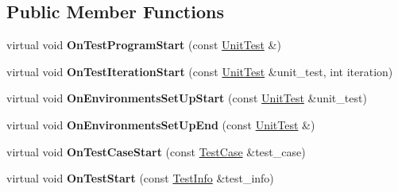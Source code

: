 \subsection*{Public Member Functions}
\begin{DoxyCompactItemize}
\item 
\mbox{\label{classtesting_1_1internal_1_1_pretty_unit_test_result_printer_a7a6b6de195b4ef3c9f2edd2e6c270f3e}} 
virtual void {\bfseries On\+Test\+Program\+Start} (const \mbox{\hyperlink{classtesting_1_1_unit_test}{Unit\+Test}} \&)
\item 
\mbox{\label{classtesting_1_1internal_1_1_pretty_unit_test_result_printer_abdba10a8c97e272ab4cee97cb652c957}} 
virtual void {\bfseries On\+Test\+Iteration\+Start} (const \mbox{\hyperlink{classtesting_1_1_unit_test}{Unit\+Test}} \&unit\+\_\+test, int iteration)
\item 
\mbox{\label{classtesting_1_1internal_1_1_pretty_unit_test_result_printer_a846a5e82b421e04fcdd2b1b2b64b162f}} 
virtual void {\bfseries On\+Environments\+Set\+Up\+Start} (const \mbox{\hyperlink{classtesting_1_1_unit_test}{Unit\+Test}} \&unit\+\_\+test)
\item 
\mbox{\label{classtesting_1_1internal_1_1_pretty_unit_test_result_printer_aadba892f02606a8b0c5f5982b3553aac}} 
virtual void {\bfseries On\+Environments\+Set\+Up\+End} (const \mbox{\hyperlink{classtesting_1_1_unit_test}{Unit\+Test}} \&)
\item 
\mbox{\label{classtesting_1_1internal_1_1_pretty_unit_test_result_printer_adcb68c729565d4bcdf8418a52902c3de}} 
virtual void {\bfseries On\+Test\+Case\+Start} (const \mbox{\hyperlink{classtesting_1_1_test_case}{Test\+Case}} \&test\+\_\+case)
\item 
\mbox{\label{classtesting_1_1internal_1_1_pretty_unit_test_result_printer_a5078ee71cfa97e37ae7a9366149195c5}} 
virtual void {\bfseries On\+Test\+Start} (const \mbox{\hyperlink{classtesting_1_1_test_info}{Test\+Info}} \&test\+\_\+info)

\end{DoxyCompactItemize}
